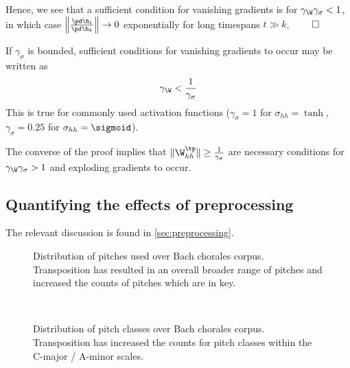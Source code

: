 Hence, we see that a sufficient condition for vanishing gradients is
for $\gamma_{\W} \gamma_\sigma < 1$, in which case $\left\| \frac{\pd \h_t}{\pd \h_k} \right\| \to 0$
exponentially for long timespans $t \gg k$. $\qed$

If $\gamma_\sigma$ is bounded, sufficient
conditions for vanishing gradients to occur may be written as
\begin{equation}
    \gamma_{\W} < \frac{1}{\gamma_\sigma}
\end{equation}
This is true for commonly used activation functions (\eg $\gamma_\sigma = 1$
for $\sigma_{hh} = \tanh$, $\gamma_\sigma = 0.25$ for $\sigma_{hh} =
\sigmoid$).

The converse of the proof implies that $\| \W_{hh}^\tp \| \geq
\frac{1}{\gamma_\sigma}$ are necessary conditions for $\gamma_{\W}
\gamma_\sigma > 1$ and exploding gradients to occur.

\subsection{Quantifying the effects of preprocessing}

The relevant discussion is found in \vref{sec:preprocessing}.

\begin{landscape}
  \begin{figure}[p]
    \centering
    \begin{subfigure}[c]{1.0\textwidth}
        \centering
        
    \end{subfigure}
    \begin{subfigure}[c]{1.0\textwidth}
        \centering
        
    \end{subfigure}
    \caption{Distribution of pitches used over Bach chorales corpus.
      Transposition has resulted in an overall broader range of pitches and
    increased the counts of pitches which are in key.}
    \label{fig:pitch-key-standardization}
  \end{figure}
\end{landscape}

\begin{figure}[htbp]
    \centering
    \begin{subfigure}[t]{0.48\textwidth}
        \centering
        
    \end{subfigure}
    ~
    \begin{subfigure}[t]{0.48\textwidth}
        \centering
        
    \end{subfigure}
    \caption{Distribution of pitch classes over Bach chorales corpus. Transposition has increased the counts
    for pitch classes within the C-major / A-minor scales.}
    \label{fig:pc-key-standardization}
\end{figure}

